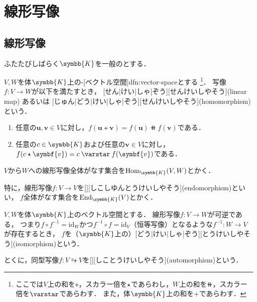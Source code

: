 \documentclass[../sotsu.tex]{subfiles}
\begin{document}
\section{線形写像}
\label{sec:linear-map}

\subsection{線形写像}

ふたたびしばらく$\symbb{K}$を一般のとする．

\begin{definition}[線形写像]
    \label{dfn:linear-map}
    $V, W$を体$\symbb{K}$上の-[ベクトル空間]{dfn:vector-space}とする
    \footnote{ここでは$V$上の和を$\tplus$，スカラー倍を$\mathbin{\star}$であらわし，$W$上の和を$\doubleplus$，スカラー倍を$\scaprodvar$であらわす．
    また，体$\symbb{K}$上の和を$+$であらわす．}．
    写像$f \colon V \to W$が以下を満たすとき，
    [せん|けい|しゃ|ぞう][せんけいしやそう](linear map)
    あるいは
    [じゅん|どう|けい|しゃ|ぞう][せんけいしやそう](homomorphism)という\cite[\S 2.1]{saito-lin-2007}．
    \begin{enumerate}
        \item 任意の$\symbf{u}, \symbf{v} \in V$に対し，$f(\symbf{u} \tplus \symbf{v}) = f(\symbf{u}) \doubleplus f(\symbf{v})$である．
        \item 任意の$c \in \symbb{K}$および任意の$\symbf{v} \in V$に対し，$f(c \scaprod \symbf{v}) = c \scaprodvar f(\symbf{v})$である．
    \end{enumerate}
    $V$から$W$への線形写像全体がなす集合を$\mathrm{Hom}_{\symbb{K}}(V, W)$とかく\cite[\S 4.4]{saito-lin-2007}．

    特に，線形写像$f \colon V \to V$を[][しこしゆんとうけいしやそう](endomorphism)といい，
    $f$全体がなす集合を$\mathrm{End}_{\symbb{K}}(V)$とかく\cite[\S 2.1, \S 4.4]{saito-lin-2007}．
\end{definition}


\begin{definition}[同型写像]
    \label{dfn:isomorphism}
    $V, W$を体$\symbb{K}$上のベクトル空間とする．
    線形写像$f \colon V \to W$が可逆である，
    つまり$f \circ f^{-1} = \mathrm{id}_W$かつ$f^{-1} \circ f = \mathrm{id}_V$（恒等写像）となるような$f^{-1} \colon W \to V$が存在するとき，
    $f$を（$\symbb{K}$上の）[どう|けい|しゃ|ぞう][とうけいしやそう](isomorphism)という．

    とくに，同型写像$f \colon V \similarrightarrow V$を[][しことうけいしやそう](automorphism)という\cite[\S 2.1]{saito-lin-2007}．
\end{definition}
\end{document}
